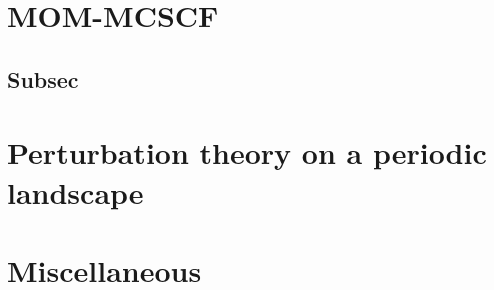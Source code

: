 \documentclass[11pt,a4paper]{article}
\begin{document}
\section{MOM-MCSCF}
\label{sec:MOM-MCSCF}

\subsection{Subsec}

\section{Perturbation theory on a periodic landscape}
\label{sec:PT}

\section{Miscellaneous}
\label{sec:misc}
\end{document}
